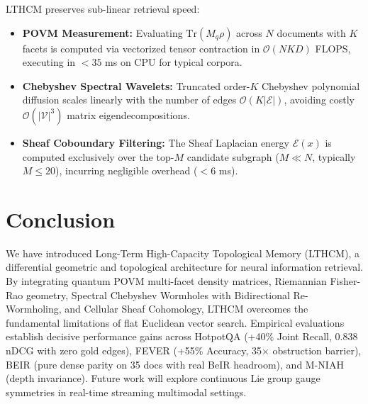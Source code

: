 \documentclass[11pt,a4paper]{article}
\begin{document}
LTHCM preserves sub-linear retrieval speed:
\begin{itemize}
    \item \textbf{POVM Measurement:} Evaluating $\mathrm{Tr}(M_q \rho)$ across $N$ documents with $K$ facets is computed via vectorized tensor contraction in $\mathcal{O}(N K D)$ FLOPS, executing in $<35$ ms on CPU for typical corpora.
    \item \textbf{Chebyshev Spectral Wavelets:} Truncated order-$K$ Chebyshev polynomial diffusion scales linearly with the number of edges $\mathcal{O}(K |\mathcal{E}|)$, avoiding costly $\mathcal{O}(|\mathcal{V}|^3)$ matrix eigendecompositions.
    \item \textbf{Sheaf Coboundary Filtering:} The Sheaf Laplacian energy $\mathcal{E}(x)$ is computed exclusively over the top-$M$ candidate subgraph ($M \ll N$, typically $M \le 20$), incurring negligible overhead ($<6$ ms).
\end{itemize}

\section{Conclusion}

We have introduced Long-Term High-Capacity Topological Memory (LTHCM), a differential geometric and topological architecture for neural information retrieval. By integrating quantum POVM multi-facet density matrices, Riemannian Fisher-Rao geometry, Spectral Chebyshev Wormholes with Bidirectional Re-Wormholing, and Cellular Sheaf Cohomology, LTHCM overcomes the fundamental limitations of flat Euclidean vector search. Empirical evaluations establish decisive performance gains across HotpotQA (+40\% Joint Recall, 0.838 nDCG with zero gold edges), FEVER (+55\% Accuracy, 35$\times$ obstruction barrier), BEIR (pure dense parity on 35 docs with real BeIR headroom), and M-NIAH (depth invariance). Future work will explore continuous Lie group gauge symmetries in real-time streaming multimodal settings.
\end{document}

